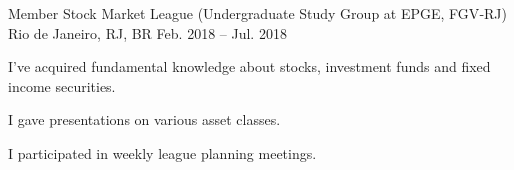


\begin{cventries}


\cventry
{Member} %
{Stock Market League (Undergraduate Study Group at EPGE, FGV‑RJ)} %
{Rio de Janeiro, RJ, BR} %
{Feb. 2018 -- Jul. 2018} %
{ %
\begin{cvitems}
\item {I’ve acquired fundamental knowledge about stocks, investment funds and fixed income securities.}
\item {I gave presentations on various asset classes.}
\item {I participated in weekly league planning meetings.}
\end{cvitems}
}


\end{cventries}